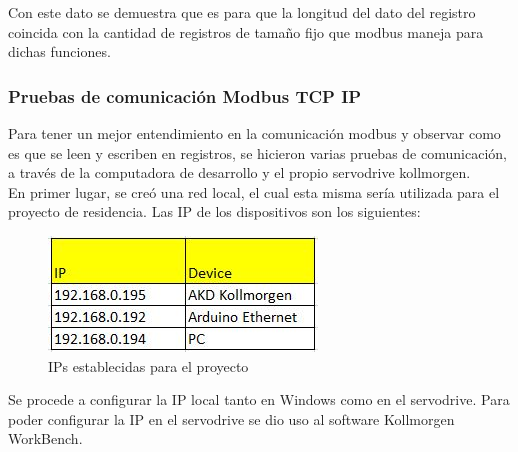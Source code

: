 \documentclass[12pt,titlepage]{article}
\begin{document}
Con este dato se demuestra que es para que la longitud del dato del registro coincida con la cantidad de registros de tamaño fijo que modbus maneja para dichas funciones. \\ 

\subsubsection{Pruebas de comunicación Modbus TCP IP }
Para tener un mejor entendimiento en la comunicación modbus y observar como es que se leen y escriben en registros, se hicieron varias pruebas de comunicación, a través de la computadora de desarrollo y el propio servodrive kollmorgen. \\ 

En primer lugar, se creó una red local, el cual esta misma sería utilizada para el proyecto de residencia. Las IP de los dispositivos son los siguientes: \\ 

 \begin{figure}[htbp]
\hspace*{5.1cm} 
\includegraphics[scale=0.88]{Ip_s}
\caption{IPs establecidas para el proyecto }
\end{figure}

Se procede a configurar la IP local tanto en Windows como en el servodrive. Para poder configurar la IP en el servodrive se dio uso al software Kollmorgen WorkBench. \\
\end{document}

